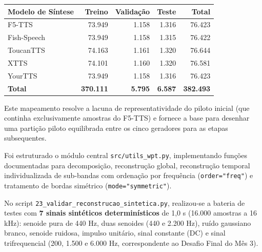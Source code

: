 \documentclass[11pt,a4paper]{article}
\newcommand{\subtitulo}[1]{\vspace{4pt}{\large\bfseries #1}\par\vspace{2pt}}
\begin{document}
\begin{center}
\begin{tabular}{lrrrr}\toprule
\textbf{Modelo de Síntese} & \textbf{Treino} & \textbf{Validação} & \textbf{Teste} & \textbf{Total}\\\midrule
F5-TTS & 73.949 & 1.158 & 1.316 & 76.423\\
Fish-Speech & 73.949 & 1.158 & 1.315 & 76.422\\
ToucanTTS & 74.163 & 1.161 & 1.320 & 76.644\\
XTTS & 74.101 & 1.160 & 1.320 & 76.581\\
YourTTS & 73.949 & 1.158 & 1.316 & 76.423\\\midrule
\textbf{Total} & \textbf{370.111} & \textbf{5.795} & \textbf{6.587} & \textbf{382.493}\\\bottomrule
\end{tabular}
\end{center}

Este mapeamento resolve a lacuna de representatividade do piloto inicial (que continha exclusivamente amostras do F5-TTS) e fornece a base para desenhar uma partição piloto equilibrada entre os cinco geradores para as etapas subsequentes.

\subtitulo{2.2 Módulo modular de WPT e validação com sinais sintéticos}
Foi estruturado o módulo central \texttt{src/utils\_wpt.py}, implementando funções documentadas para decomposição, reconstrução global, reconstrução temporal individualizada de sub-bandas com ordenação por frequência (\texttt{order="freq"}) e tratamento de bordas simétrico (\texttt{mode="symmetric"}).

No script \texttt{23\_validar\_reconstrucao\_sintetica.py}, realizou-se a bateria de testes com \textbf{7 sinais sintéticos determinísticos} de 1,0 s (16.000 amostras a 16 kHz): senoide pura de 440 Hz, duas senoides (440 e 2.200 Hz), ruído gaussiano branco, senoide ruidosa, impulso unitário, sinal constante (DC) e sinal trifrequencial (200, 1.500 e 6.000 Hz, correspondente ao Desafio Final do Mês 3).
\end{document}
